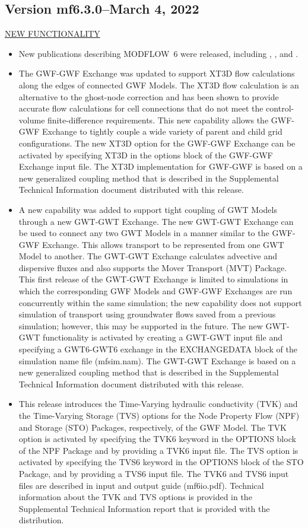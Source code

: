 	\subsection{Version mf6.3.0--March 4, 2022}
	
	\underline{NEW FUNCTIONALITY}
	\begin{itemize}
		\item New publications describing MODFLOW~6 were released, including \cite{modflow6api}, \cite{modflow6gwt}, and \cite{modflow6csub}. 
	        \item The GWF-GWF Exchange was updated to support XT3D flow calculations along the edges of connected GWF Models.  The XT3D flow calculation is an alternative to the ghost-node correction and has been shown to provide accurate flow calculations for cell connections that do not meet the control-volume finite-difference requirements.  This new capability allows the GWF-GWF Exchange to tightly couple a wide variety of parent and child grid configurations.  The new XT3D option for the GWF-GWF Exchange can be activated by specifying XT3D in the options block of the GWF-GWF Exchange input file.  The XT3D implementation for GWF-GWF is based on a new generalized coupling method that is described in the Supplemental Technical Information document distributed with this release.
	        \item A new capability was added to support tight coupling of GWT Models through a new GWT-GWT Exchange.  The new GWT-GWT Exchange can be used to connect any two GWT Models in a manner similar to the GWF-GWF Exchange.  This allows transport to be represented from one GWT Model to another.  The GWT-GWT Exchange calculates advective and dispersive fluxes and also supports the Mover Transport (MVT) Package.  This first release of the GWT-GWT Exchange is limited to simulations in which the corresponding GWF Models and GWF-GWF Exchanges are run concurrently within the same simulation; the new capability does not support simulation of transport using groundwater flows saved from a previous simulation; however, this may be supported in the future.  The new GWT-GWT functionality is activated by creating a GWT-GWT input file and specifying a GWT6-GWT6 exchange in the EXCHANGEDATA block of the simulation name file (mfsim.nam).  The GWT-GWT Exchange is based on a new generalized coupling method that is described in the Supplemental Technical Information document distributed with this release.
	        \item This release introduces the Time-Varying hydraulic conductivity (TVK) and the Time-Varying Storage (TVS) options for the Node Property Flow (NPF) and Storage (STO) Packages, respectively, of the GWF Model.  The TVK option is activated by specifying the TVK6 keyword in the OPTIONS block of the NPF Package and by providing a TVK6 input file.  The TVS option is activated by specifying the TVS6 keyword in the OPTIONS block of the STO Package, and by providing a TVS6 input file.  The TVK6 and TVS6 input files are described in input and output guide (mf6io.pdf).  Technical information about the TVK and TVS options is provided in the Supplemental Technical Information report that is provided with the distribution.

\end{itemize}
